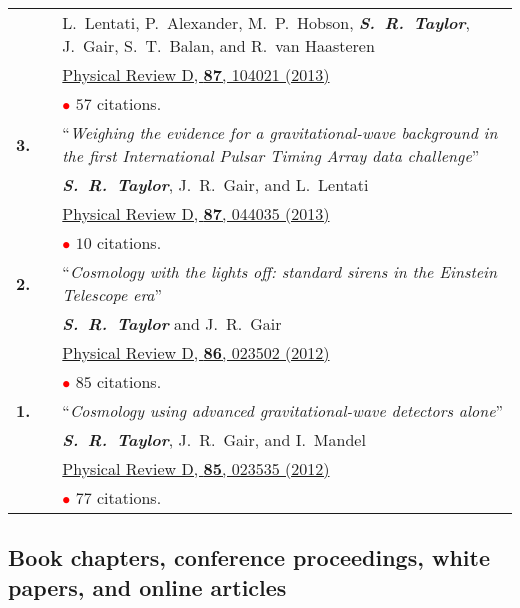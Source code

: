 \documentclass[11pt,letterpaper,sans]{moderncv}
\begin{document}
{\begin{longtable}{rp{0.3cm}p{15.8cm}}
&& L.~Lentati, P.~Alexander, M.~P.~Hobson, \textit{\textbf{S.~R.~Taylor}}, J.~Gair, S.~T.~Balan, and R.~van Haasteren \\ 
&& \href{http://journals.aps.org/prd/abstract/10.1103/PhysRevD.87.104021}{{\color{color1} Physical Review D, \textbf{87}, 104021 (2013)}} \\
&& \textcolor{red}{$\bullet$} $57$ citations. \vspace{0.09cm}\\
\textbf{3.} & & ``\textit{Weighing the evidence for a gravitational-wave background in the first International Pulsar Timing Array data challenge}'' \\ 
&& \textit{\textbf{S.~R.~Taylor}}, J.~R.~Gair, and L.~Lentati \\ 
&& \href{http://journals.aps.org/prd/abstract/10.1103/PhysRevD.87.044035}{{\color{color1} Physical Review D, \textbf{87}, 044035 (2013)}} \\
&& \textcolor{red}{$\bullet$} $10$ citations. \vspace{0.09cm}\\
\textbf{2.} & & ``\textit{Cosmology with the lights off: standard sirens in the Einstein Telescope era}'' \\ 
&& \textit{\textbf{S.~R.~Taylor}} and J.~R.~Gair \\ 
&& \href{http://journals.aps.org/prd/abstract/10.1103/PhysRevD.86.023502}{{\color{color1} Physical Review D, \textbf{86}, 023502 (2012)}} \\
&& \textcolor{red}{$\bullet$} $85$ citations. \vspace{0.09cm}\\
\textbf{1.} & & ``\textit{Cosmology using advanced gravitational-wave detectors alone}'' \\ 
&& \textit{\textbf{S.~R.~Taylor}}, J.~R.~Gair, and I.~Mandel \\ 
&& \href{http://journals.aps.org/prd/abstract/10.1103/PhysRevD.85.023535}{{\color{color1} Physical Review D, \textbf{85}, 023535 (2012)}} \\
&& \textcolor{red}{$\bullet$} $77$ citations. \vspace{0.09cm}\\
\end{longtable}
}

\subsection{Book chapters, conference proceedings, white papers, and online articles} \vspace{-0.4cm}
\end{document}
